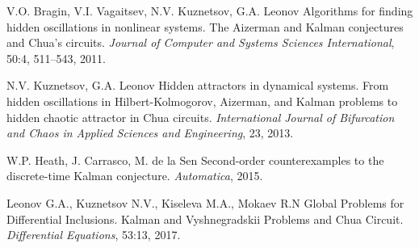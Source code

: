 \documentclass{ifacconf}
\theoremstyle{plain}
\begin{document}
\begin{thebibliography}{xx}
 V.O. Bragin, V.I. Vagaitsev, N.V. Kuznetsov, G.A. Leonov
 \newblock Algorithms for finding hidden oscillations in nonlinear systems. The Aizerman and Kalman conjectures and Chua's circuits.
 \newblock \emph{Journal of Computer and Systems Sciences International}, 50:4, 511--543, 2011.

 N.V. Kuznetsov, G.A. Leonov
 \newblock Hidden attractors in dynamical systems. From hidden oscillations in Hilbert-Kolmogorov, Aizerman, and Kalman problems to hidden chaotic attractor in Chua circuits.
 \newblock \emph{International Journal of Bifurcation and Chaos in Applied Sciences and Engineering}, 23, 2013.

 W.P. Heath, J. Carrasco, M. de la Sen
 \newblock Second-order counterexamples to the discrete-time Kalman conjecture.
 \newblock \emph{Automatica}, 2015.

 Leonov G.A., Kuznetsov N.V., Kiseleva M.A., Mokaev R.N
 \newblock Global Problems for Differential Inclusions. Kalman and Vyshnegradskii Problems and Chua Circuit.
 \newblock \emph{Differential Equations}, 53:13, 2017.

 \end{thebibliography}

\end{document}
